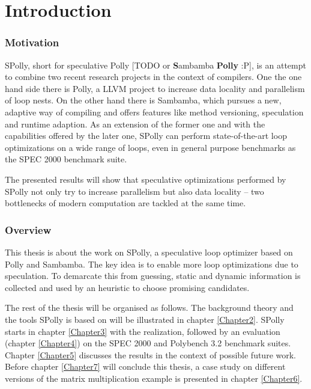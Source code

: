 
\chapter{Introduction} %
\label{Chapter1}

\orange
\begin{shaded}
\subsection{Motivation}

SPolly, short for speculative Polly [TODO or \textbf{S}ambamba \textbf{Polly} :P],
is an attempt to combine two recent research projects in the context of compilers.
One the one hand side there is Polly, a LLVM project to increase data locality
and parallelism of loop nests. On the other hand there is Sambamba, which 
pursues a new, adaptive way of compiling and offers features like method 
versioning, speculation and runtime adaption. As an extension of the former one
and with the capabilities offered by the later one,
SPolly can perform state-of-the-art loop optimizations on a wide range of loops,
even in general purpose benchmarks as the SPEC 2000 benchmark suite. 

The presented results will show that speculative optimizations performed by
SPolly not only try to increase parallelism but also data locality --  two
bottlenecks of modern computation are tackled at the same time. 


\subsection{Overview}

This thesis is about the work on SPolly, a speculative loop optimizer based on
Polly and Sambamba. The key idea is to enable more loop optimizations due to 
speculation. To demarcate this from guessing, static and dynamic information 
is collected and used by an heuristic to choose promising candidates. 

The rest of the thesis will be organised as follows. 
The background theory and the tools SPolly is based 
on will be illustrated in chapter \ref{Chapter2}.
SPolly starts in chapter \ref{Chapter3} with the realization,
followed by an evaluation (chapter \ref{Chapter4}) on the SPEC 2000 and 
Polybench 3.2 benchmark suites. 
Chapter \ref{Chapter5} discusses the results in the context of
possible future work.
Before chapter \ref{Chapter7}
will conclude this thesis, a case study on different versions of the matrix 
multiplication example is presented in chapter \ref{Chapter6}. 

\end{shaded}


